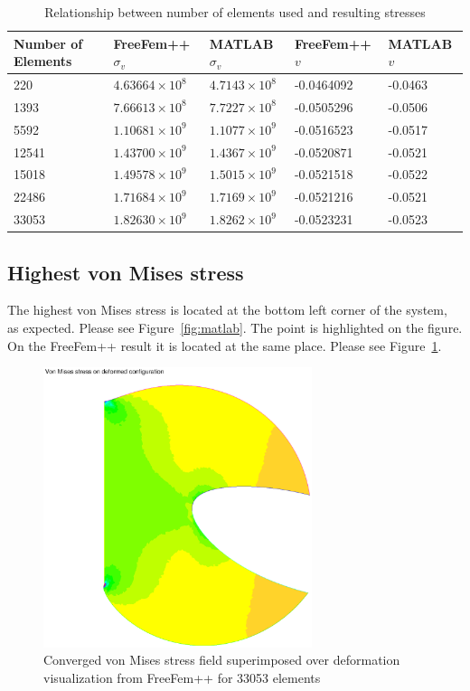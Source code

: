 \documentclass[11pt,fleqn]{article}
\begin{document}
\begin{table}[h]
\centering
\begin{tabular}{@{}lllll@{}}
\toprule
Number of Elements & FreeFem++ $\sigma_v$ & MATLAB $\sigma_v$ & FreeFem++ $v$  & MATLAB $v$  \\ \midrule
220                & $4.63664\times 10^8$     &$ 4.7143\times 10^8$   & -0.0464092    & -0.0463    \\
1393               & $7.66613\times 10^8$     &$ 7.7227\times 10^8$   & -0.0505296    & -0.0506    \\
5592               & $1.10681\times 10^9$     &$ 1.1077\times 10^9$   & -0.0516523    & -0.0517    \\
12541              & $1.43700\times 10^9$     &$ 1.4367\times 10^9$   & -0.0520871    & -0.0521    \\
15018              & $1.49578\times 10^9$     &$ 1.5015\times 10^9$   & -0.0521518    & -0.0522    \\
22486              & $1.71684\times 10^9$     &$ 1.7169\times 10^9$   & -0.0521216    & -0.0521    \\ 
33053              & $1.82630\times 10^9$     &$ 1.8262\times 10^9$   & -0.0523231    & -0.0523    \\
\bottomrule
\end{tabular}
\caption{Relationship between number of elements used and resulting stresses}
\label{table:convergence}
\end{table}

\subsection{Highest von Mises stress} 

The highest von Mises stress is located at the bottom left corner of the system, as expected. Please see Figure~\ref{fig:matlab}. The point is highlighted on the figure. On the FreeFem++ result it is located at the same place. Please see Figure~\ref{fig:freefem}. 

\begin{figure}[!htb]
\centering
\includegraphics[width=0.7\textwidth]{freefem.eps}
\caption{Converged von Mises stress field superimposed over deformation visualization from FreeFem++ for 33053 elements}
\label{fig:freefem}
\end{figure}
\end{document}
